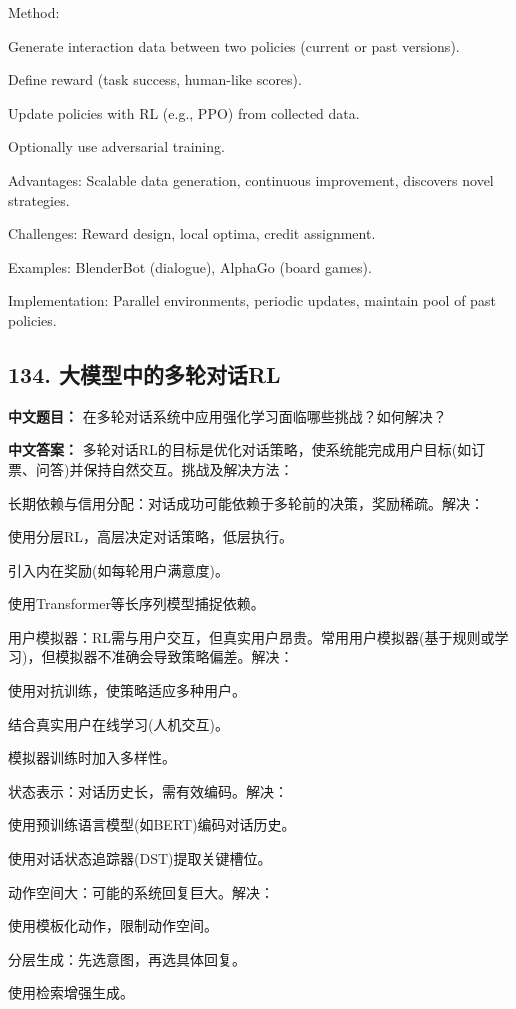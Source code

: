 \documentclass[10pt,a4paper]{ctexart}
\begin{document}
Method:

Generate interaction data between two policies (current or past versions).

Define reward (task success, human-like scores).

Update policies with RL (e.g., PPO) from collected data.

Optionally use adversarial training.

Advantages: Scalable data generation, continuous improvement, discovers novel strategies.

Challenges: Reward design, local optima, credit assignment.

Examples: BlenderBot (dialogue), AlphaGo (board games).

Implementation: Parallel environments, periodic updates, maintain pool of past policies.

\subsection*{134. 大模型中的多轮对话RL}
\textbf{中文题目：} 在多轮对话系统中应用强化学习面临哪些挑战？如何解决？

\textbf{中文答案：}
多轮对话RL的目标是优化对话策略，使系统能完成用户目标(如订票、问答)并保持自然交互。挑战及解决方法：

长期依赖与信用分配：对话成功可能依赖于多轮前的决策，奖励稀疏。解决：

使用分层RL，高层决定对话策略，低层执行。

引入内在奖励(如每轮用户满意度)。

使用Transformer等长序列模型捕捉依赖。

用户模拟器：RL需与用户交互，但真实用户昂贵。常用用户模拟器(基于规则或学习)，但模拟器不准确会导致策略偏差。解决：

使用对抗训练，使策略适应多种用户。

结合真实用户在线学习(人机交互)。

模拟器训练时加入多样性。

状态表示：对话历史长，需有效编码。解决：

使用预训练语言模型(如BERT)编码对话历史。

使用对话状态追踪器(DST)提取关键槽位。

动作空间大：可能的系统回复巨大。解决：

使用模板化动作，限制动作空间。

分层生成：先选意图，再选具体回复。

使用检索增强生成。
\end{document}
